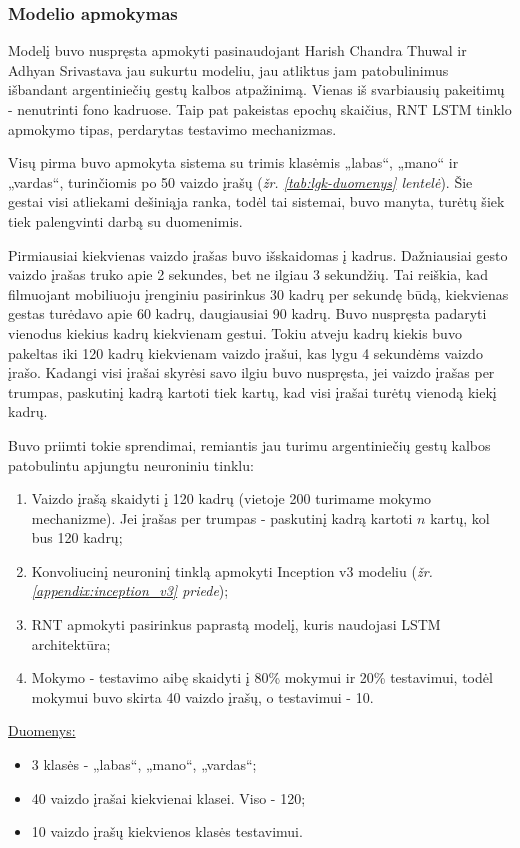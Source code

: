 \documentclass{VUMIFPSbakalaurinis}
\begin{document}
\subsubsection{Modelio apmokymas}

Modelį buvo nuspręsta apmokyti pasinaudojant Harish Chandra Thuwal ir Adhyan Srivastava jau sukurtu modeliu, jau atliktus jam patobulinimus išbandant argentiniečių gestų kalbos atpažinimą. Vienas iš svarbiausių pakeitimų - nenutrinti fono kadruose. Taip pat pakeistas epochų skaičius, RNT LSTM tinklo apmokymo tipas, perdarytas testavimo mechanizmas.

Visų pirma buvo apmokyta sistema su trimis klasėmis „labas“, „mano“ ir „vardas“, turinčiomis po 50 vaizdo įrašų (\textit{žr. \ref{tab:lgk-duomenys} lentelė}). Šie gestai visi atliekami dešiniąja ranka, todėl tai sistemai, buvo manyta, turėtų šiek tiek palengvinti darbą su duomenimis.

Pirmiausiai kiekvienas vaizdo įrašas buvo išskaidomas į kadrus. Dažniausiai gesto vaizdo įrašas truko apie 2 sekundes, bet ne ilgiau 3 sekundžių. Tai reiškia, kad filmuojant mobiliuoju įrenginiu pasirinkus 30 kadrų per sekundę būdą, kiekvienas gestas turėdavo apie 60 kadrų, daugiausiai 90 kadrų. Buvo nuspręsta padaryti vienodus kiekius kadrų kiekvienam gestui. Tokiu atveju kadrų kiekis buvo pakeltas iki 120 kadrų kiekvienam vaizdo įrašui, kas lygu 4 sekundėms vaizdo įrašo. Kadangi visi įrašai skyrėsi savo ilgiu buvo nuspręsta, jei vaizdo įrašas per trumpas, paskutinį kadrą kartoti tiek kartų, kad visi įrašai turėtų vienodą kiekį kadrų. 

Buvo priimti tokie sprendimai, remiantis jau turimu argentiniečių gestų kalbos patobulintu apjungtu neuroniniu tinklu:
\begin{enumerate}
	\item Vaizdo įrašą skaidyti į 120 kadrų (vietoje 200 turimame mokymo mechanizme). Jei įrašas per trumpas - paskutinį kadrą kartoti $n$ kartų, kol bus 120 kadrų;
	\item Konvoliucinį neuroninį tinklą apmokyti Inception v3 modeliu (\textit{žr. \ref{appendix:inception_v3} priede});
	\item RNT apmokyti pasirinkus paprastą modelį, kuris naudojasi LSTM architektūra;
	\item Mokymo - testavimo aibę skaidyti į 80\% mokymui ir 20\% testavimui, todėl mokymui buvo skirta 40 vaizdo įrašų, o testavimui - 10.
\end{enumerate}

\underline{Duomenys:}
\begin{itemize}
	\item 3 klasės - „labas“, „mano“, „vardas“;
	\item 40 vaizdo įrašai kiekvienai klasei. Viso - 120;
	\item 10 vaizdo įrašų kiekvienos klasės testavimui. 
\end{itemize}
\end{document}
